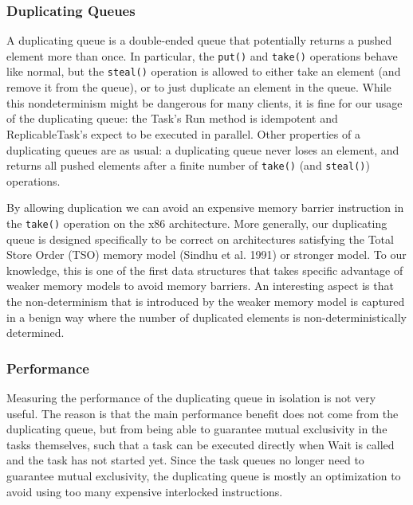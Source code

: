 \subsubsection{Duplicating Queues}

A duplicating queue is a double-ended queue that potentially returns a
pushed element more than once. In particular, the \lstinline!put()!
and \lstinline!take()! operations behave like normal, but the
\lstinline!steal()! operation is allowed to either take an element
(and remove it from the queue), or to just duplicate an element in the
queue. While this nondeterminism might be dangerous for many clients,
it is fine for our usage of the duplicating queue: the Task's Run
method is idempotent and ReplicableTask's expect to be executed in
parallel. Other properties of a duplicating queues are as usual: a
duplicating queue never loses an element, and returns all pushed
elements after a finite number of \lstinline!take()! (and
\lstinline!steal()!) operations.

By allowing duplication we can avoid an expensive memory barrier
instruction in the \lstinline!take()! operation on the x86
architecture. More generally, our duplicating queue is designed
specifically to be correct on architectures satisfying the Total Store
Order (TSO) memory model (Sindhu et al. 1991) or stronger model. To
our knowledge, this is one of the first data structures that takes
specific advantage of weaker memory models to avoid memory
barriers. An interesting aspect is that the non-determinism that is
introduced by the weaker memory model is captured in a benign way
where the number of duplicated elements is non-deterministically
determined.

\subsubsection{Performance}

Measuring the performance of the duplicating queue in isolation is not
very useful. The reason is that the main performance benefit does not
come from the duplicating queue, but from being able to guarantee
mutual exclusivity in the tasks themselves, such that a task can be
executed directly when Wait is called and the task has not started
yet. Since the task queues no longer need to guarantee mutual
exclusivity, the duplicating queue is mostly an optimization to avoid
using too many expensive interlocked instructions.

